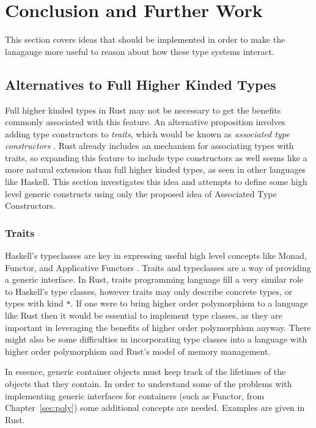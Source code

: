 \chapter{Conclusion and Further Work}\label{sec:conclusion}
This section covers ideas that should be implemented in order to make the
lanagauge more useful to reason about how these type systems interact.

\section{Alternatives to Full Higher Kinded Types}
Full higher kinded types in Rust may not be necessary to get the benefits
commonly associated with this feature. An alternative proposition involves
adding type constructors to \textit{traits}, which would be known as
\textit{associated type constructors} \cite{rfc1598}. Rust already includes an
mechanism for associating types with traits, so expanding this feature to
include type constructors as well seems like a more natural extension than full
higher kinded types, as seen in other languages like Haskell. This section
investigates this idea and attempts to define some high level generic constructs
using only the proposed idea of Associated Type Constructors.

\subsection{Traits}
Haskell's typeclasses are key in expressing useful high level concepts like
Monad, Functor, and Applicative Functors \cite{consclasses}. Traits and
typeclasses are a way of providing a generic interface. In Rust, traits
programming language fill a very similar role to Haskell's type classes,
however traits may only describe concrete types, or types with kind
\lstinline{*}. If one were to bring higher order polymorphism to a language
like Rust then it would be essential to implement type classes, as they are
important in leveraging the benefits of higher order polymorphism anyway. There
might also be some difficulties in incorporating type classes into a language
with higher order polymorphism and Rust's model of memory management.

In essence, generic container objects must keep track of the lifetimes of the
objects that they contain.  In order to understand some of the problems with
implementing generic interfaces for containers (such as Functor, from
Chapter~\ref{sec:poly}) some additional concepts are needed. Examples are given
in Rust.

